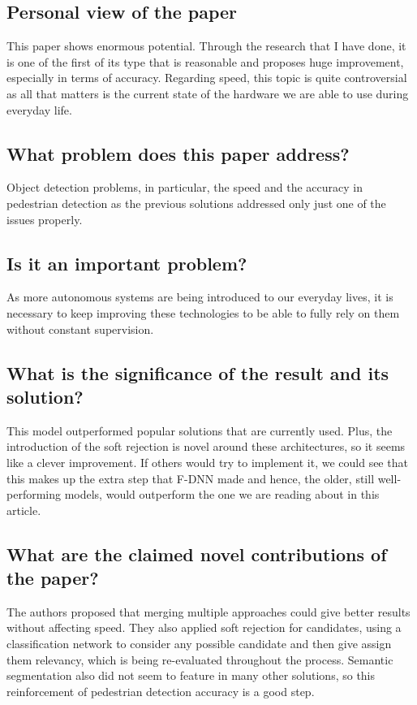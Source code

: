\documentclass[11pt,a4paper]{article}
\begin{document}
\subsection*{Personal view of the paper}
This paper shows enormous potential. Through the research that I have done, it is one of the first of its type that is reasonable and proposes huge improvement, especially in terms of accuracy. Regarding speed, this topic is quite controversial as all that matters is the current state of the hardware we are able to use during everyday life.

\subsection*{What problem does this paper address?}
Object detection problems, in particular, the speed and the accuracy in pedestrian detection as the previous solutions addressed only just one of the issues properly.

\subsection*{Is it an important problem?}
As more autonomous systems are being introduced to our everyday lives, it is necessary to keep improving these technologies to be able to fully rely on them without constant supervision.

\subsection*{What is the significance of the result and its solution?}
This model outperformed popular solutions that are currently used. Plus, the introduction of the soft rejection is novel around these architectures, so it seems like a clever improvement. If others would try to implement it, we could see that this makes up the extra step that F-DNN made and hence, the older, still well-performing models, would outperform the one we are reading about in this article.

\subsection*{What are the claimed novel contributions of the paper?}
The authors proposed that merging multiple approaches could give better results without affecting speed. They also applied soft rejection for candidates, using a classification network to consider any possible candidate and then give assign them relevancy, which is being re-evaluated throughout the process. Semantic segmentation also did not seem to feature in many other solutions, so this reinforcement of pedestrian detection accuracy is a good step.
\end{document}
